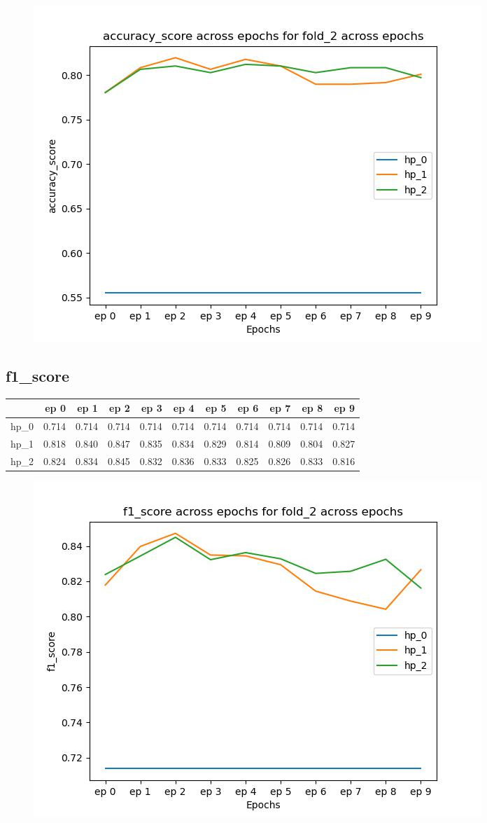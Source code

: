 \documentclass{article}
\begin{document}
\begin{figure}[H]
\includegraphics[scale = 0.75]{fold_2/accuracy_score}
\end{figure}
\subsection{f1\_score}
\begin{tabular}{lrrrrrrrrrr}
\toprule
{} &   ep 0 &   ep 1 &   ep 2 &   ep 3 &   ep 4 &   ep 5 &   ep 6 &   ep 7 &   ep 8 &   ep 9 \\
\midrule
hp\_0 &  0.714 &  0.714 &  0.714 &  0.714 &  0.714 &  0.714 &  0.714 &  0.714 &  0.714 &  0.714 \\
hp\_1 &  0.818 &  0.840 &  0.847 &  0.835 &  0.834 &  0.829 &  0.814 &  0.809 &  0.804 &  0.827 \\
hp\_2 &  0.824 &  0.834 &  0.845 &  0.832 &  0.836 &  0.833 &  0.825 &  0.826 &  0.833 &  0.816 \\
\bottomrule
\end{tabular}

\begin{figure}[H]
\includegraphics[scale = 0.75]{fold_2/f1_score}
\end{figure}
\end{document}
